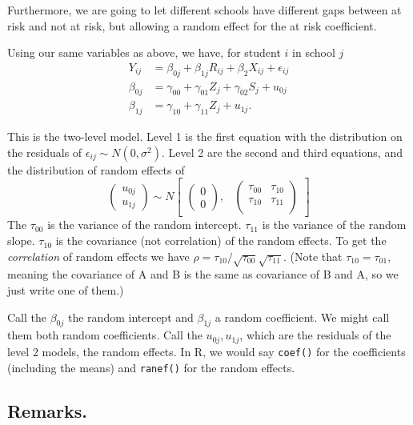 \documentclass[
  letterpaper,
  DIV=11,
  numbers=noendperiod]{scrreprt}
\begin{document}
Furthermore, we are going to let different schools have different gaps
between at risk and not at risk, but allowing a random effect for the at
risk coefficient.

Using our same variables as above, we have, for student \(i\) in school
\(j\) \[\begin{aligned}
Y_{ij} &= \beta_{0j} + \beta_{1j} R_{ij} + \beta_{2} X_{ij} + \epsilon_{ij} \\
\beta_{0j} &= \gamma_{00} + \gamma_{01} Z_{j} + \gamma_{02} S_{j} + u_{0j} \\
\beta_{1j} &= \gamma_{10} + \gamma_{11} Z_{j} + u_{1j} .
\end{aligned}\]

This is the two-level model. Level 1 is the first equation with the
distribution on the residuals of
\(\epsilon_{ij} \sim N( 0, \sigma^2 )\). Level 2 are the second and
third equations, and the distribution of random effects of \[
\begin{pmatrix} u_{0j} \\
u_{1j}
\end{pmatrix} \sim  N
\begin{bmatrix}
\begin{pmatrix}
0 \\
0
\end{pmatrix}\!\!,&
\begin{pmatrix}
\tau_{00} & \tau_{10} \\
\tau_{10} & \tau_{11} \\
\end{pmatrix}
\end{bmatrix}
\] The \(\tau_{00}\) is the variance of the random intercept.
\(\tau_{11}\) is the variance of the random slope. \(\tau_{10}\) is the
covariance (not correlation) of the random effects. To get the
\emph{correlation} of random effects we have
\(\rho = \tau_{10} / \sqrt{ \tau_{00} } \sqrt{ \tau_{11} }\). (Note that
\(\tau_{10} = \tau_{01}\), meaning the covariance of A and B is the same
as covariance of B and A, so we just write one of them.)

Call the \(\beta_{0j}\) the random intercept and \(\beta_{1j}\) a random
coefficient. We might call them both random coefficients. Call the
\(u_{0j}, u_{1j}\), which are the residuals of the level 2 models, the
random effects. In R, we would say \texttt{coef()} for the coefficients
(including the means) and \texttt{ranef()} for the random effects.

\hypertarget{remarks.-2}{%
\subsection{Remarks.}\label{remarks.-2}}
\end{document}
